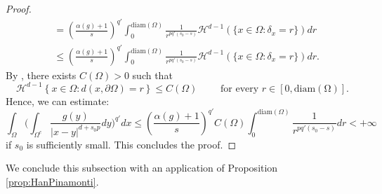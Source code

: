\documentclass[reqno,11pt]{amsart}
\numberwithin{equation}{section}
\theoremstyle{definition} %
\theoremstyle{plain}
\theoremstyle{definition}
\theoremstyle{remark}
\def\Haus{{\mathcal{H}^{d-1}}}
\def\O{\Omega}
\newcommand{\abs}[1]{\left|#1\right|}
\begin{document}
\begin{proof}
\begin{equation*}
\begin{split}
        &=\left(\frac{\alpha(g)+1}{s}\right)^{q'}\int_0^{\mathrm{diam}(\O)}\frac{1}{r^{pq'(s_0-s)}}\Haus(\{x\in\O:\delta_x=r\})dr\\
        &\leq\left(\frac{\alpha(g)+1}{s}\right)^{q'}\int_0^{\mathrm{diam}(\O)}\frac{1}{r^{pq'(s_0-s)}}\Haus(\{x\in\O:\delta_x=r\})dr.
    \end{split}
\end{equation*}
By \cite[Section 3.2, Corollary 2]{Kraft2016}, there exists $C(\O)>0$ such that 
\[
\mathcal{H}^{d-1} \left\{ x\in \O:d(x,\partial \O)=r\right\}\leq C(\O)\qquad\text{ for every }r\in[0,\mathrm{diam(\O)}].
\]
Hence, we can estimate:
\begin{equation*}
      \int_\O\bigg(\int_{\O^c}\frac{g(y)}{\abs{x-y}^{d+s_0p}}dy\bigg)^{q'}dx\leq \left(\frac{\alpha(g)+1}{s}\right)^{q'}C(\O)\int_0^{\mathrm{diam}(\O)}\frac{1}{r^{pq'(s_0-s)}}dr<+\infty
\end{equation*}
if $s_0$ is sufficiently small. This concludes the proof.
\end{proof}

We conclude this subsection with an application of Proposition \ref{prop:HanPinamonti}.
\end{document}

